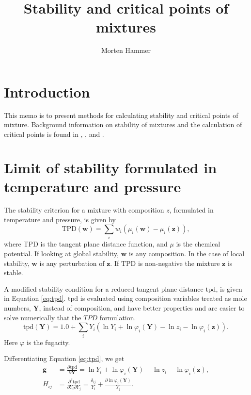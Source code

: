 \documentclass[english]{../thermomemo/thermomemo}
\title{Stability and critical points of mixtures}
\author{Morten Hammer}
\newcommand*{\pd}[3][]{\frac{\partial^{#1}#2}{\partial{#3}^{#1}}}%
\newcommand*{\vektor}[1]{\boldsymbol{#1}}%
\newcommand{\tpd}{\ensuremath{\text{tpd}}\xspace}
\newcommand{\TPD}{\ensuremath{\text{TPD}}\xspace}
\begin{document}
\frontmatter
\tableofcontents
\section{Introduction}
This memo is to present methods for calculating stability and critical points of
mixture. Background information on stability of mixtures and the calculation of
critical points is found in \citet{Reid1977}, \citet{Heidemann1980},
\citet{Michelsen1984} and \citet[Chap. 9]{Michelsen2007}.
\section{Limit of stability formulated in temperature and pressure}
\label{sec:tp_fomulation}
The stability criterion for a mixture with composition $z$, formulated
in temperature and pressure, is given by
\begin{equation}
  \label{eq:TPDorg}
  \TPD(\vektor{w}) = \underset{i}{\sum}w_i\left(\mu_i(\vektor{w})-\mu_i(\vektor{z})\right),
\end{equation}
where \TPD is the tangent plane distance function, and $\mu$ is the
chemical potential. If looking at global stability, $\vektor{w}$ is any
composition. In the case of local stability, $\vektor{w}$ is any perturbation
of $\vektor{z}$. If \TPD is non-negative the mixture $\vektor{z}$ is stable.

A modified stability condition for a reduced tangent plane
distance \tpd, is given in Equation \ref{eq:tpd}. \tpd is evaluated
using composition variables treated as mole numbers, $\vektor{Y}$, instead of
composition, and have better properties and are easier to solve
numerically that the $TPD$ formulation.
\begin{equation}
  \tpd(\vektor{Y}) = 1.0 + \underset{i}{\sum}Y_i\left(\ln Y_i + \ln \varphi_i(\vektor{Y})-\ln z_i - \ln \varphi_i(\vektor{z})\right).
  \label{eq:tpd}
\end{equation}
Here $\varphi$ is the fugacity.

Differentiating Equation \ref{eq:tpd}, we get
\begin{align}
  \vektor{g} &= \pd{\tpd}{\vektor{Y}} = \ln Y_i + \ln \varphi_i(\vektor{Y})-\ln z_i - \ln \varphi_i(\vektor{z}),\\
  H_{ij} &= \frac{\partial^2\tpd}{\partial Y_i \partial Y_j} = \frac{\delta_{ij}}{Y_i} + \frac{\partial \ln \varphi_i(\vektor{Y})}{Y_j}.
  \label{eq:dtpd}
\end{align}
\end{document}
